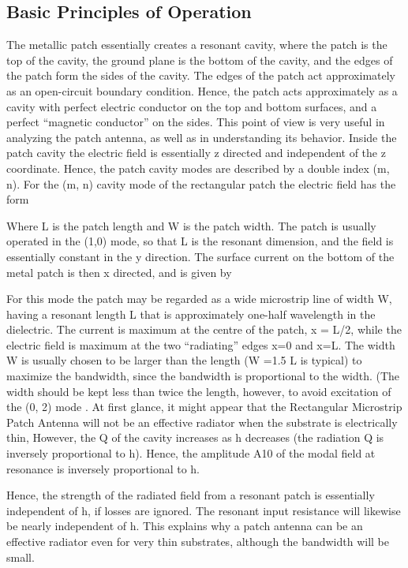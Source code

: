 \documentclass[12pt]{article}
\begin{document}
         \subsection{ Basic Principles of Operation}
          \justify
           The  metallic  patch  essentially  creates  a  resonant  cavity,  where  the  patch  is  the  top  of  the cavity, the ground plane is the bottom of the cavity, and the edges of the patch form the sides of the cavity. The edges of the patch act approximately as an open-circuit boundary condition. Hence, the patch acts approximately as a cavity with perfect electric conductor on the top and bottom surfaces, and a perfect “magnetic conductor” on the sides. This point of view is very useful in analyzing the patch antenna, as well as in understanding its behavior. Inside the patch cavity the electric field is essentially z directed and independent of the z coordinate. Hence, the patch cavity modes are described by a double index (m, n). For the (m, n) cavity mode of the rectangular patch the electric field has the form

           Where L is the patch length and W is the patch width. The patch is usually operated in the (1,0) mode,  so  that  L  is  the  resonant  dimension,  and  the  field  is  essentially  constant  in  the y direction. The surface current on the bottom of the metal patch is then x directed, and is given by

           For  this  mode  the  patch  may  be  regarded  as  a  wide  microstrip  line  of  width  W,  having  a resonant  length  L  that  is  approximately  one-half  wavelength  in  the  dielectric.  The  current  is maximum  at  the  centre  of  the  patch,  x  =  L/2,  while  the  electric  field  is  maximum  at  the  two “radiating” edges x=0 and x=L. The width W is usually chosen to be larger than the length (W =1.5 L is typical) to maximize the bandwidth, since the bandwidth is proportional to the width. (The width should be kept less than twice the length, however, to avoid excitation of the (0, 2) mode .
           At first glance, it might appear that the Rectangular Microstrip Patch Antenna will not be an effective radiator when the substrate is electrically thin,   However, the Q of the cavity increases as  h decreases (the radiation Q is inversely proportional to h). Hence, the amplitude A10  of the modal field  at  resonance  is  inversely  proportional  to  h.

           Hence,  the  strength  of  the  radiated  field  from  a resonant patch is  essentially independent  of  h,  if  losses are ignored. The resonant input resistance will  likewise  be  nearly  independent  of  h.  This  explains  why  a  patch  antenna  can  be  an  effective radiator even for very thin substrates, although the bandwidth will be small.
\end{document}
